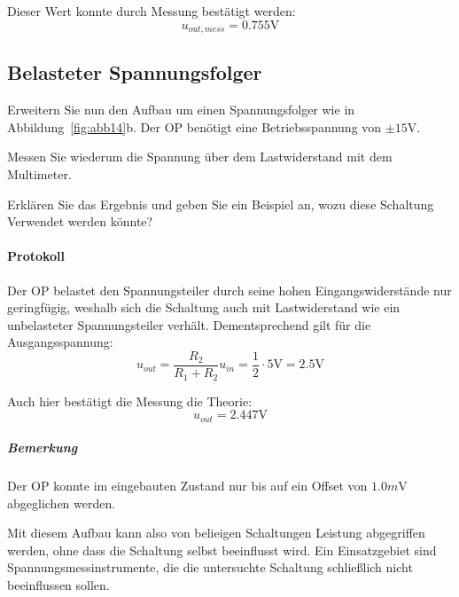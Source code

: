 \documentclass[10pt]{scrreprt}
\begin{document}
    Dieser Wert konnte durch Messung bestätigt werden:
    \begin{equation*}
        u_{out, mess} = 0.755\si{\volt}
    \end{equation*}

    \subsection{Belasteter Spannungsfolger}
    Erweitern Sie nun den Aufbau um einen Spannungsfolger wie in Abbildung~\ref{fig:abb14}b. Der OP
    benötigt eine Betriebsspannung von $\pm 15\si{\volt}$.

    Messen Sie wiederum die Spannung über dem Lastwiderstand mit dem Multimeter.

    \vspace{0.5cm}

    Erklären Sie das Ergebnis und geben Sie ein Beispiel an, wozu diese Schaltung Verwendet
    werden könnte?

    \paragraph{Protokoll}
    Der OP belastet den Spannungsteiler durch seine hohen Eingangswiderstände
    nur geringfügig, weshalb sich die Schaltung auch mit Lastwiderstand wie ein
    unbelasteter Spannungsteiler verhält. Dementsprechend gilt für die Ausgangsspannung:
    \begin{equation*}
        u_{out} = \frac{R_2}{R_1+R_2} u_{in} = \frac{1}{2}\cdot 5\si{\volt} = 2.5\si{\volt}
    \end{equation*}

    Auch hier bestätigt die Messung die Theorie:
    \begin{equation*}
        u_{out} = 2.447\si{\volt}
    \end{equation*}

    \subparagraph{Bemerkung}
    Der OP konnte im eingebauten Zustand nur bis auf ein Offset von $1.0\si{m\volt}$
    abgeglichen werden.

    \vspace{0.5cm}

    Mit diesem Aufbau kann also von belieigen Schaltungen Leistung abgegriffen
    werden, ohne dass die Schaltung selbst beeinflusst wird. Ein Einsatzgebiet
    sind Spannungsmessinstrumente, die die untersuchte Schaltung schließlich
    nicht beeinflussen sollen.
\end{document}
